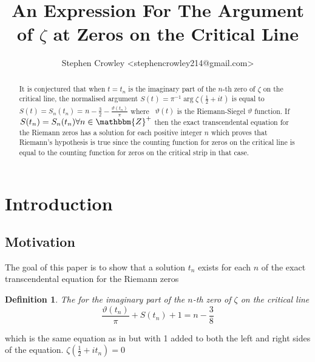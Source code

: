 \documentclass{article}
\newcommand{\tmverbatim}[1]{{\ttfamily{#1}}}
\newtheorem{definition}{Definition}
\begin{document}
\title{An Expression For The Argument of $\zeta$ at Zeros on the Critical
Line}

\author{Stephen Crowley <stephencrowley214@gmail.com>}

\maketitle

\begin{abstract}
  It is conjectured that when $t = t_n$ is the imaginary part of the $n$-th
  zero of $\zeta$ on the critical line, the normalised argument $S (t_{})_{} =
  \pi^{- 1} \arg \zeta \left( \frac{1}{2} + i t_{} \right)$ is equal to $S (t)
  = S_n (t_n) =_{} n - \frac{3}{2} - \frac{\vartheta (t_n)}{\pi}$ where \
  $\vartheta (t)$ is the Riemann-Siegel $\vartheta$ function. If $S (t_n) =
  S_n (t_n) \forall n \in \mathbbm{Z}^+$ then the exact transcendental
  equation for the Riemann zeros has a solution for each positive integer $n$
  which proves that Riemann's hypothesis is true since the counting function
  for zeros on the critical line is equal to the counting function for zeros
  on the critical strip in that case.
\end{abstract}

\section{Introduction}

\subsection{Motivation}

The goal of this paper is to show that a solution $t_n$ exists for each $n$ of
the exact transcendental equation for the Riemann zeros

\begin{definition}
  The \tmverbatim{exact equation} for the imaginary part of the $n$-th zero of
  $\zeta$ on the critical line
  \begin{equation}
    \frac{\vartheta (t_n)}{\pi} + S (t_n) + 1 = n - \frac{3}{8}
  \end{equation}
\end{definition}

which is the same equation as in {\cite[Equation 20]{z0t}} but with 1 added to
both the left and right sides of the equation. $\zeta \left( \frac{1}{2} + i
t_n \right) = 0$

\
\end{document}
